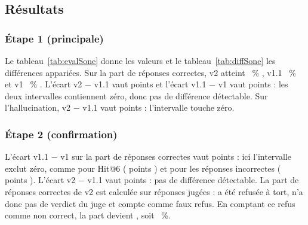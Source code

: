 \subsection{Résultats}\label{sec:resultats}

\subsubsection{Étape 1 (principale)}
Le tableau~\ref{tab:evalSone} donne les valeurs et le tableau~\ref{tab:diffSone} les différences appariées. Sur la part de
réponses correctes, v2 atteint \EvSoneVtwoCorrect~\% \EvSoneVtwoCorrectCI, v1.1 \EvSoneVoneoneCorrect~\%
\EvSoneVoneoneCorrectCI{} et v1 \EvSoneVoneCorrect~\% \EvSoneVoneCorrectCI. L'écart v2 $-$ v1.1 vaut
\EvDiffSoneVtwoVoneoneCorrect{} points \EvDiffSoneVtwoVoneoneCorrectCI{} et l'écart v1.1 $-$ v1 vaut
\EvDiffSoneVoneoneVoneCorrect{} points \EvDiffSoneVoneoneVoneCorrectCI : les deux intervalles contiennent zéro, donc pas de
différence détectable. Sur l'hallucination, v2 $-$ v1.1 vaut \EvDiffSoneVtwoVoneoneHalluc{} points
\EvDiffSoneVtwoVoneoneHallucCI{} : l'intervalle touche zéro.




\subsubsection{Étape 2 (confirmation)}
L'écart v1.1 $-$ v1 sur la part de réponses correctes vaut \EvDiffStwoVoneoneVoneCorrect{} points
\EvDiffStwoVoneoneVoneCorrectCI{} : ici l'intervalle exclut zéro, comme pour Hit@6 (\EvDiffStwoVoneoneVoneHit{} points
\EvDiffStwoVoneoneVoneHitCI) et pour les réponses incorrectes (\EvDiffStwoVoneoneVoneIncorrect{} points
\EvDiffStwoVoneoneVoneIncorrectCI). L'écart v2 $-$ v1.1 vaut \EvDiffStwoVtwoVoneoneCorrect{} points
\EvDiffStwoVtwoVoneoneCorrectCI{} : pas de différence détectable. La part de réponses correctes de v2 est calculée sur
\EvStwoVtwoCorrectN{} réponses jugées : \EvStwoVtwoNoVerdict{} a été refusée à tort, n'a donc pas de verdict du juge et compte
comme faux refus. En comptant ce refus comme non correct, la part devient \EvStwoVtwoCorrectAllCount{}, soit
\EvStwoVtwoCorrectAll~\%.





